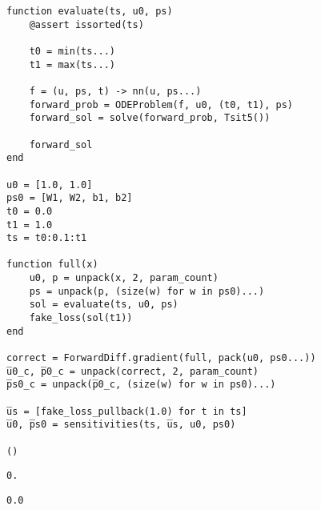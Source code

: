 \documentclass[11pt]{article}
\begin{document}
\begin{verbatim}
function evaluate(ts, u0, ps)
    @assert issorted(ts)

    t0 = min(ts...)
    t1 = max(ts...)

    f = (u, ps, t) -> nn(u, ps...)
    forward_prob = ODEProblem(f, u0, (t0, t1), ps)
    forward_sol = solve(forward_prob, Tsit5())

    forward_sol
end

u0 = [1.0, 1.0]
ps0 = [W1, W2, b1, b2]
t0 = 0.0
t1 = 1.0
ts = t0:0.1:t1

function full(x)
    u0, p = unpack(x, 2, param_count)
    ps = unpack(p, (size(w) for w in ps0)...)
    sol = evaluate(ts, u0, ps)
    fake_loss(sol(t1))
end

correct = ForwardDiff.gradient(full, pack(u0, ps0...))
u̅0_c, p̅0_c = unpack(correct, 2, param_count)
p̅s0_c = unpack(p̅0_c, (size(w) for w in ps0)...)

u̅s = [fake_loss_pullback(1.0) for t in ts]
u̅0, p̅s0 = sensitivities(ts, u̅s, u0, ps0)

()
\end{verbatim}

\begin{verbatim}
0.
\end{verbatim}

\begin{verbatim}
0.0
\end{verbatim}
\end{document}

